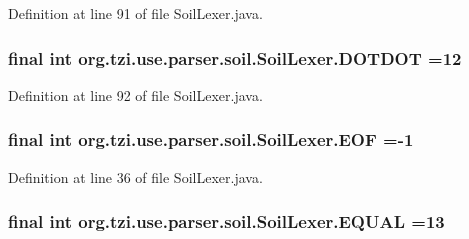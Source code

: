 Definition at line 91 of file Soil\-Lexer.\-java.

\hypertarget{classorg_1_1tzi_1_1use_1_1parser_1_1soil_1_1_soil_lexer_a830aada37be54f2e2944898fd31ebabe}{
\subsubsection[{D\-O\-T\-D\-O\-T}]{\setlength{\rightskip}{0pt plus 5cm}final int org.\-tzi.\-use.\-parser.\-soil.\-Soil\-Lexer.\-D\-O\-T\-D\-O\-T =12\hspace{0.3cm}{\ttfamily [static]}}}\label{classorg_1_1tzi_1_1use_1_1parser_1_1soil_1_1_soil_lexer_a830aada37be54f2e2944898fd31ebabe}


Definition at line 92 of file Soil\-Lexer.\-java.

\hypertarget{classorg_1_1tzi_1_1use_1_1parser_1_1soil_1_1_soil_lexer_a337fc78d57369951c359d473a0dc4222}{
\subsubsection[{E\-O\-F}]{\setlength{\rightskip}{0pt plus 5cm}final int org.\-tzi.\-use.\-parser.\-soil.\-Soil\-Lexer.\-E\-O\-F =-\/1\hspace{0.3cm}{\ttfamily [static]}}}\label{classorg_1_1tzi_1_1use_1_1parser_1_1soil_1_1_soil_lexer_a337fc78d57369951c359d473a0dc4222}


Definition at line 36 of file Soil\-Lexer.\-java.

\hypertarget{classorg_1_1tzi_1_1use_1_1parser_1_1soil_1_1_soil_lexer_ae3e5fd084bd97fca12d8878025c7945b}{
\subsubsection[{E\-Q\-U\-A\-L}]{\setlength{\rightskip}{0pt plus 5cm}final int org.\-tzi.\-use.\-parser.\-soil.\-Soil\-Lexer.\-E\-Q\-U\-A\-L =13\hspace{0.3cm}{\ttfamily [static]}}}\label{classorg_1_1tzi_1_1use_1_1parser_1_1soil_1_1_soil_lexer_ae3e5fd084bd97fca12d8878025c7945b}


